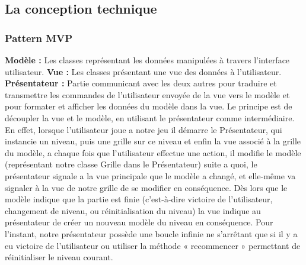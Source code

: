 \documentclass[a4paper,12pt]{article} %
\begin{document}

\subsection{La conception technique} 
\subsubsection{Pattern MVP}
\noindent
\textbf{Modèle :}
\newline\newline
Les classes représentant les données manipulées à travers l'interface utilisateur.
\newline\newline
\noindent
\textbf{Vue :}
\newline\newline
Les classes présentant une vue des données à l'utilisateur.
\newline\newline
\noindent
\textbf{Présentateur :}
\newline\newline
Partie communicant avec les deux autres pour traduire et transmettre les commandes de l'utilisateur envoyée de la vue vers le modèle et pour formater et afficher les données du modèle dans la vue.
\newline
Le principe est de découpler la vue et le modèle, en utilisant le présentateur comme intermédiaire.
\newline\newline
En effet, lorsque l’utilisateur joue a notre jeu il démarre le Présentateur, qui instancie un niveau, puis une grille sur ce niveau et enfin la vue associé à la grille du modèle, a chaque fois que l’utilisateur effectue une action, il modifie le modèle (représentant notre classe Grille dans le Présentateur) suite a quoi, 	le présentateur signale a la vue principale que le modèle a changé, et elle-même va signaler à la vue de notre grille de se modifier en conséquence.
\newline
Dès lors que le modèle indique que la partie est finie (c’est-à-dire victoire de l’utilisateur, changement de niveau, ou réinitialisation du niveau) la vue indique au présentateur de créer un nouveau modèle du niveau en conséquence. 
\newline
Pour l’instant, notre présentateur possède une boucle infinie ne s’arrêtant que si il y a eu victoire de l’utilisateur ou utiliser la méthode « recommencer » permettant de réinitialiser le niveau courant.
\end{document}
